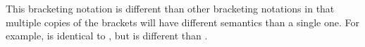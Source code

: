 \begin{openissue}
This bracketing notation is different than other bracketing notations
in that multiple copies of the brackets will have different semantics
than a single one.  For example,  is identical
to , but \chpl{[[[1..n)))} is different
than \chpl{[1..n)}.
\end{openissue}
